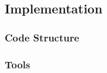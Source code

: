 \documentclass[aps,pra,english,notitlepage,reprint,nofootinbib]{revtex4-1}  %
\begin{document}
\subsection{Implementation}\label{subsec:code}
\subsubsection{Code Structure}\label{subsubsec:codestructure}

\subsubsection{Tools}\label{subsubsec:tools}
\end{document}
